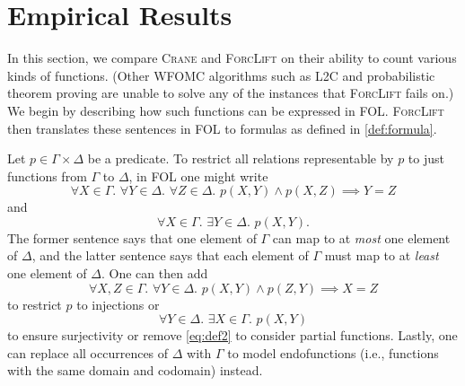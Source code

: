 \section{Empirical Results}\label{sec:results} %

In this section, we compare \textsc{Crane} and \textsc{ForcLift}
\citep{DBLP:conf/ijcai/BroeckTMDR11} on their ability to count various kinds of
functions. (Other WFOMC algorithms such as \textsc{L2C}
\citep{DBLP:conf/kr/KazemiP16} and probabilistic theorem proving
\citep{DBLP:journals/cacm/GogateD16} are unable to solve any of the instances
that \textsc{ForcLift} fails on.) We begin by describing how such functions can
be expressed in FOL\@. \textsc{ForcLift} then translates these sentences in FOL
to formulas as defined in \cref{def:formula}.

Let $p \in \Gamma \times \Delta$ be a predicate. To restrict all relations
representable by $p$ to just functions from $\Gamma$ to $\Delta$, in FOL one
might write
\[
  \forall X \in \Gamma\text{. }\forall Y \in \Delta\text{. }\forall Z \in \Delta\text{. }p(X, Y) \land p(X, Z) \implies Y = Z
\]
and
\begin{equation}\label{eq:def2}
  \forall X \in \Gamma\text{. }\exists Y \in \Delta\text{. }p(X, Y).
\end{equation}
The former sentence says that one element of $\Gamma$ can map to at \emph{most}
one element of $\Delta$, and the latter sentence says that each element of
$\Gamma$ must map to at \emph{least} one element of $\Delta$. One can then add
\[
  \forall X,Z \in \Gamma\text{. }\forall Y \in \Delta\text{. }p(X, Y) \land p(Z, Y) \implies X = Z
\]
to restrict $p$ to injections or
\[
  \forall Y \in \Delta\text{. }\exists X \in \Gamma\text{. }p(X, Y)
\]
to ensure surjectivity or remove \cref{eq:def2} to consider partial functions.
Lastly, one can replace all occurrences of $\Delta$ with $\Gamma$ to model
endofunctions (i.e., functions with the same domain and codomain) instead.

